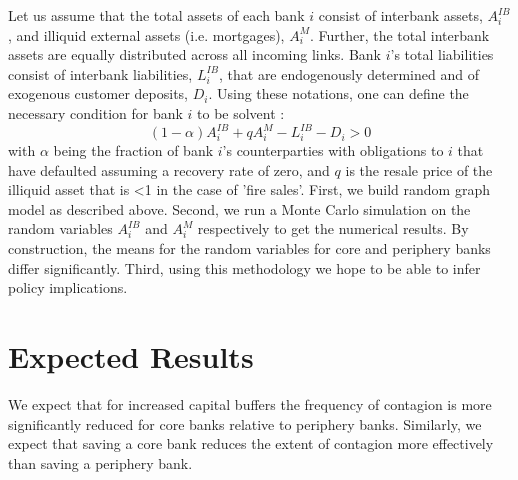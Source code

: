 \documentclass[12pt,a4paper,oneside]{article} %
\begin{document}
Let us assume that the total assets of each bank $i$ consist of
interbank assets, $A_i^{IB}$, and illiquid external assets
(i.e. mortgages), $A_i^M$. Further, the total interbank assets are
equally distributed across all incoming links. Bank $i$'s total
liabilities consist of interbank liabilities, $L_i^{IB}$, that are
endogenously determined and of exogenous customer deposits,
$D_i$. Using these notations, one can define the necessary condition
for bank $i$ to be solvent \citep{Gai2010}:
\begin{equation}
(1-\alpha)A_i^{IB}+qA_i^M-L_i^{IB}-D_i>0
\end{equation} 
with $\alpha$ being the fraction of bank $i$'s counterparties with
obligations to $i$ that have defaulted assuming a recovery rate of zero, and $q$ is the resale price of the illiquid asset that is <1 in the case of 'fire sales'.
First, we build random graph model as described above. Second, we run
a Monte Carlo simulation on the random variables $A_i^{IB}$ and
$A_i^{M}$ respectively to get the numerical results. By construction, the means for the random
variables for core and periphery banks differ significantly. Third,
using this methodology we hope to be able to infer policy implications.

\section*{Expected Results}
We expect that for increased capital buffers the frequency of
contagion is more significantly reduced for core banks relative to
periphery banks. Similarly, we expect that saving a core bank reduces the extent of contagion more effectively than saving a periphery bank.  


 




\end{document}
